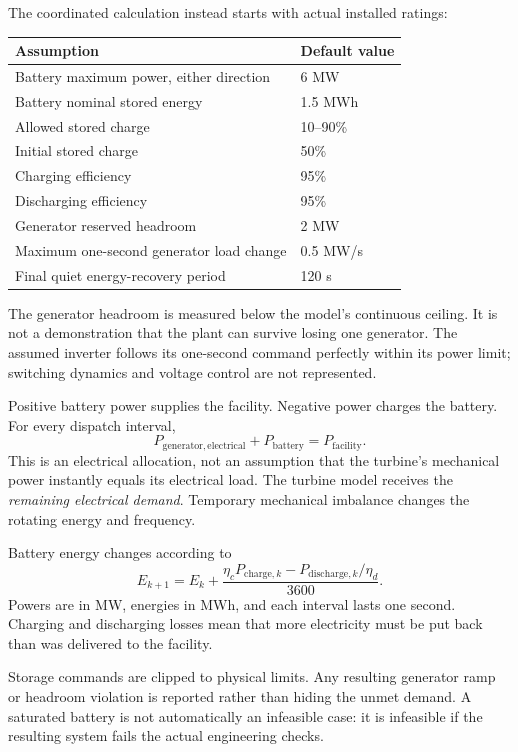 \documentclass[11pt]{article}
\begin{document}
The coordinated calculation instead starts with actual installed ratings:
\begin{center}
\begin{tabular}{ll}
\toprule
Assumption & Default value\\
\midrule
Battery maximum power, either direction & 6 MW\\
Battery nominal stored energy & 1.5 MWh\\
Allowed stored charge & 10--90\%\\
Initial stored charge & 50\%\\
Charging efficiency & 95\%\\
Discharging efficiency & 95\%\\
Generator reserved headroom & 2 MW\\
Maximum one-second generator load change & 0.5 MW/s\\
Final quiet energy-recovery period & 120 s\\
\bottomrule
\end{tabular}
\end{center}

The generator headroom is measured below the model's continuous ceiling.
It is not a demonstration that the plant can survive losing one generator.
The assumed inverter follows its one-second command perfectly within its
power limit; switching dynamics and voltage control are not represented.

Positive battery power supplies the facility. Negative power charges the
battery. For every dispatch interval,
\[
P_{\mathrm{generator,electrical}}+P_{\mathrm{battery}}
=P_{\mathrm{facility}}.
\]
This is an electrical allocation, not an assumption that the turbine's
mechanical power instantly equals its electrical load. The turbine model
receives the \emph{remaining electrical demand}. Temporary mechanical
imbalance changes the rotating energy and frequency.

Battery energy changes according to
\[
E_{k+1}=E_k+
\frac{\eta_c P_{\mathrm{charge},k}
-P_{\mathrm{discharge},k}/\eta_d}{3600}.
\]
Powers are in MW, energies in MWh, and each interval lasts one second.
Charging and discharging losses mean that more electricity must be put back
than was delivered to the facility.

Storage commands are clipped to physical limits. Any resulting generator
ramp or headroom violation is reported rather than hiding the unmet demand.
A saturated battery is not automatically an infeasible case: it is infeasible
if the resulting system fails the actual engineering checks.
\end{document}
